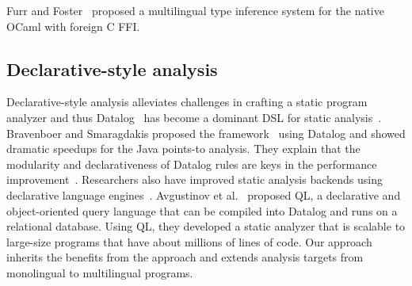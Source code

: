 Furr and Foster~\cite{furr2005, furr2008} proposed a multilingual type
inference system for the native OCaml with foreign C FFI.  


\subsection{Declarative-style analysis}
Declarative-style analysis alleviates challenges in crafting a static program
analyzer and thus Datalog~\cite{allen2015D, allen2015stagedD, alpuente2010D,
doop, dawson1996D, naik2006D, reps1994D, smaragdakis2014D, whaley2005D} has
become a dominant DSL for static analysis~\cite{scholz2016}.  Bravenboer and
Smaragdakis proposed the \doop framework~\cite{doop} using Datalog and showed
dramatic speedups for the Java points-to analysis.  They explain that the
modularity and declarativeness of Datalog rules are keys in the performance
improvement~\cite{doopWorkshop}.  Researchers also have improved static
analysis backends using declarative language engines~\cite{whaley2005D,
hoder2011muz, souffle, madsen2016}.  Avgustinov et al.~\cite{ql2016} proposed
QL, a declarative and object-oriented query language that can be compiled into
Datalog and runs on a relational database. Using QL, they developed a static
analyzer that is scalable to large-size programs that have about millions of
lines of code.  Our approach inherits the benefits from the approach and
extends analysis targets from monolingual to multilingual programs.
